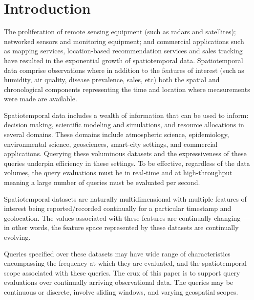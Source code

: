 \section{Introduction}
\label{sec:introduction}
The proliferation of remote sensing equipment (such as radars and satellites); networked sensors and monitoring equipment; and commercial applications such as mapping services, location-based recommendation services and sales tracking have resulted in the exponential growth of spatiotemporal data. Spatiotemporal data comprise observations where in addition to the features of interest (such as humidity, air quality, disease prevalence, sales, etc) both the spatial and chronological components representing the time and location where measurements were made are available. 

Spatiotemporal data includes a wealth of information that can be used to inform: decision making, scientific modeling and simulations, and resource allocations in several domains.  These domains include atmospheric science, epidemiology, environmental science, geosciences, smart-city settings, and commercial applications.  Querying these voluminous datasets and the expressiveness of these queries underpin efficiency in these settings. To be effective, regardless of the data volumes, the query evaluations must be in real-time and at high-throughput meaning a large number of queries must be evaluated per second. 

Spatiotemporal datasets are naturally multidimensional with multiple features of interest being reported/recorded continually for a particular timestamp and geolocation. The values associated with these features are continually changing --- in other words, the feature space represented by these datasets are continually evolving. 

Queries specified over these datasets may have wide range of characteristics encompassing the frequency at which they are evaluated, and the spatiotemporal scope associated with these queries. The crux of this paper is to support query evaluations over continually arriving observational data. The queries may be continuous or discrete, involve sliding windows, and varying geospatial scopes.

